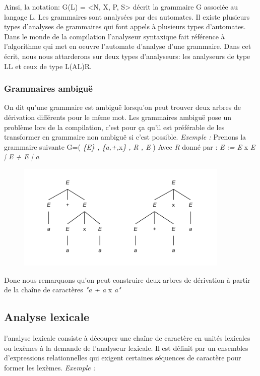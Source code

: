 \documentclass{article}
\begin{document}
Ainsi, la notation: G(L) = <N, X, P, S> décrit la grammaire G associée au langage L.
Les grammaires sont analysées par des automates. Il existe plusieurs types d’analyses de grammaires qui font appels à plusieurs types d’automates.
Dans le monde de la compilation l’analyseur syntaxique fait référence à l’algorithme qui met en oeuvre l’automate d’analyse d’une grammaire.
Dans cet écrit, nous nous attarderons sur deux types d’analyseurs: les analyseurs de type LL et ceux de type L(AL)R.

\subsubsection{Grammaires ambiguë}
On dit qu’une grammaire est ambiguë  lorsqu’on peut trouver deux arbres de dérivation différents pour le même mot.
Les grammaires ambiguë pose un problème lors de la compilation, c’est pour ça qu’il est préférable de les transformer en grammaire non ambiguë si c’est possible.\newline
\textit{Exemple : }\newline\newline
Prenons la grammaire suivante G=( \textit{\{E\} , \{a,+,}x\textit{\} , R , E} ) \newline
Avec \textit{R} donné par : \textit{E := E} x \textit{E | E + E | a}


\begin{figure}[h!]
	\centering
		\includegraphics[width=0.90\textwidth]{grammaireAmbigue.png}
	\label{fig:grammaireAmbigue}
\end{figure}\FloatBarrier

Donc nous remarquons qu'on peut construire deux arbres de dérivation à partir de la chaîne de caractères 
\textit{"a + a} x \textit{a"} 

\subsection{Analyse lexicale}
l’analyse lexicale consiste à découper une chaîne de caractère en unités lexicales ou lexèmes à la demande de l’analyseur lexicale.
Il est définit par un ensembles d’expressions relationnelles qui exigent certaines séquences de caractère pour former les lexèmes.
\textit{Exemple :}
\end{document}
